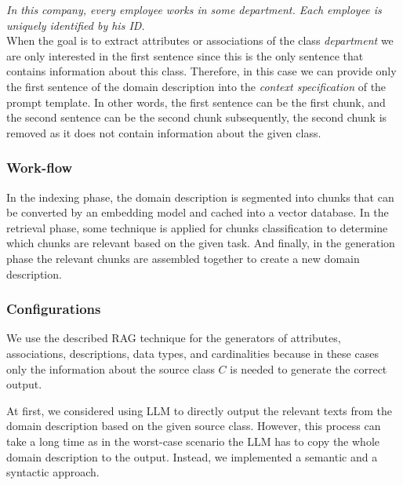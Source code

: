 \noindent{}\textit{In this company, every employee works in some department. Each employee is uniquely identified by his ID.}\\

\noindent{}When the goal is to extract attributes or associations of the class \textit{department} we are only interested in the first sentence since this is the only sentence that contains information about this class. Therefore, in this case we can provide only the first sentence of the domain description into the \emph{context specification} of the prompt template. In other words, the first sentence can be the first chunk, and the second sentence can be the second chunk subsequently, the second chunk is removed as it does not contain information about the given class.


\subsubsection{Work-flow}

In the indexing phase, the domain description is segmented into chunks that can be converted by an embedding model and cached into a vector database. In the retrieval phase, some technique is applied for chunks classification to determine which chunks are relevant based on the given task. And finally, in the generation phase the relevant chunks are assembled together to create a new domain description.


\subsubsection{Configurations}
\label{sec:rag_configurations}

We use the described RAG technique for the generators of attributes, associations, descriptions, data types, and cardinalities because in these cases only the information about the source class $C$ is needed to generate the correct output.

At first, we considered using LLM to directly output the relevant texts from the domain description based on the given source class. However, this process can take a long time as in the worst-case scenario the LLM has to copy the whole domain description to the output. Instead, we implemented a semantic and a syntactic approach.


